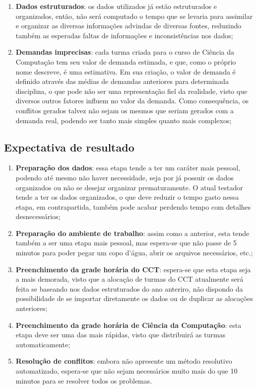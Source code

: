 \begin{enumerate}
\begin{enumerate}
          \item \textbf{Dados estruturados}: os dados utilizados já estão estruturados e organizados, então, não será computado o tempo que se levaria para assimilar e organizar as diversas informações advindas de diversas fontes, reduzindo também as esperadas faltas de informações e inconsistências nos dados;
          \item \textbf{Demandas imprecisas}: cada turma criada para o curso de Ciência da Computação tem seu valor de demanda estimada, e que, como o próprio nome descreve, é uma estimativa. Em sua criação, o valor de demanda é definido através das médias de demandas anteriores para determinada disciplina, o que pode não ser uma representação fiel da realidade, visto que diversos outros fatores influem no valor da demanda. Como consequência, os conflitos gerados talvez não sejam os mesmos que seriam gerados com a demanda real, podendo ser tanto mais simples quanto mais complexos;
        \end{enumerate}
\end{enumerate}

\subsection{Expectativa de resultado}

\begin{enumerate}
  \item \textbf{Preparação dos dados}: essa etapa tende a ter um caráter mais pessoal, podendo até mesmo não haver necessidade, seja por já possuir os dados organizados ou não se desejar organizar prematuramente. O atual testador tende a ter os dados organizados, o que deve reduzir o tempo gasto nessa etapa, em contrapartida, também pode acabar perdendo tempo com detalhes desnecessários;
  \item \textbf{Preparação do ambiente de trabalho}: assim como a anterior, esta tende também a ser uma etapa mais pessoal, mas espera-se que não passe de 5 minutos para poder pegar um copo d'água, abrir os arquivos necessários, etc.;
  \item \textbf{Preenchimento da grade horária do CCT}: espera-se que esta etapa seja a mais demorada, visto que a alocação de turmas do CCT atualmente será feita se baseando nos dados estruturados do ano anteriro, não dispondo da possibilidade de se importar diretamente os dados ou de duplicar as alocações anteriores;
  \item \textbf{Preenchimento da grade horária de Ciência da Computação}: esta etapa deve ser uma das mais rápidas, visto que distribuirá as turmas automaticamente;
  \item \textbf{Resolução de conflitos}: embora não apresente um método resolutivo automatizado, espera-se que não sejam necessários muito mais do que 10 minutos para se resolver todos os problemas.
\end{enumerate}

